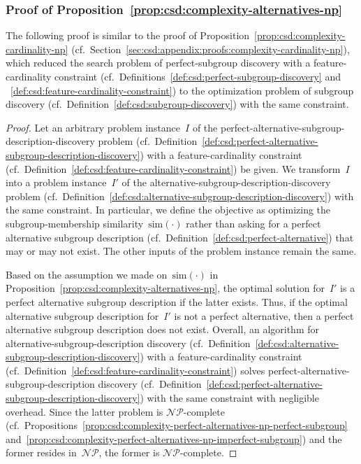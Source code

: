 \documentclass{article}
\theoremstyle{definition}
\begin{document}
\subsubsection{Proof of Proposition~\ref{prop:csd:complexity-alternatives-np}}
\label{sec:csd:appendix:proofs:complexity-alternatives-np}

The following proof is similar to the proof of Proposition~\ref{prop:csd:complexity-cardinality-np}
(cf.~Section~\ref{sec:csd:appendix:proofs:complexity-cardinality-np}), which reduced the search problem of perfect-subgroup discovery with a feature-cardinality constraint (cf.~Definitions~\ref{def:csd:perfect-subgroup-discovery} and ~\ref{def:csd:feature-cardinality-constraint}) to the optimization problem of subgroup discovery (cf.~Definition~\ref{def:csd:subgroup-discovery}) with the same constraint.
%
\begin{proof}
Let an arbitrary problem instance~$I$ of the perfect-alternative-subgroup-description-discovery problem (cf.~Definition~\ref{def:csd:perfect-alternative-subgroup-description-discovery}) with a feature-cardinality constraint (cf.~Definition~\ref{def:csd:feature-cardinality-constraint}) be given.
We transform~$I$ into a problem instance~$I'$ of the alternative-subgroup-description-discovery problem (cf.~Definition~\ref{def:csd:alternative-subgroup-description-discovery}) with the same constraint.
In particular, we define the objective as optimizing the subgroup-membership similarity~$\text{sim}(\cdot)$ rather than asking for a perfect alternative subgroup description (cf.~Definition~\ref{def:csd:perfect-alternative}) that may or may not exist.
The other inputs of the problem instance remain the same.

Based on the assumption we made on~$\text{sim}(\cdot)$ in Proposition~\ref{prop:csd:complexity-alternatives-np}, the optimal solution for~$I'$ is a perfect alternative subgroup description if the latter exists.
Thus, if the optimal alternative subgroup description for~$I'$ is not a perfect alternative, then a perfect alternative subgroup description does not exist.
Overall, an algorithm for alternative-subgroup-description discovery (cf.~Definition~\ref{def:csd:alternative-subgroup-description-discovery}) with a feature-cardinality constraint (cf.~Definition~\ref{def:csd:feature-cardinality-constraint}) solves perfect-alternative-subgroup-description discovery (cf.~Definition~\ref{def:csd:perfect-alternative-subgroup-description-discovery}) with the same constraint with negligible overhead.
Since the latter problem is $\mathcal{NP}$-complete (cf.~Propositions~\ref{prop:csd:complexity-perfect-alternatives-np-perfect-subgroup} and~\ref{prop:csd:complexity-perfect-alternatives-np-imperfect-subgroup}) and the former resides in~$\mathcal{NP}$, the former is $\mathcal{NP}$-complete.
\end{proof}

\renewcommand*{\bibfont}{\small} %
\printbibliography
\end{document}
